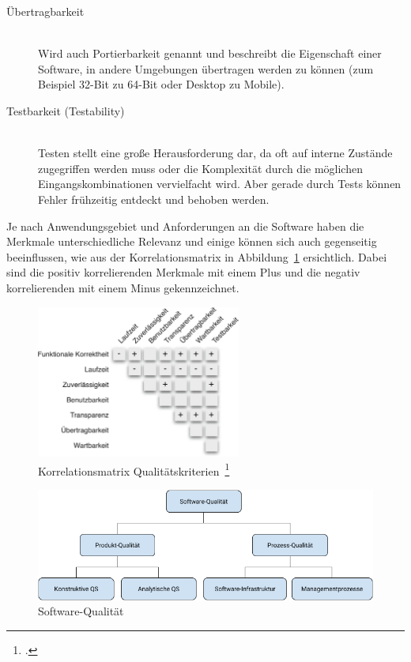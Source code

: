 \begin{description}
\begin{description}
    \item[Übertragbarkeit] \hfill \\ Wird auch Portierbarkeit genannt und beschreibt die Eigenschaft einer Software, in andere Umgebungen übertragen werden zu können (zum Beispiel 32-Bit zu 64-Bit oder Desktop zu Mobile).
    \item[Testbarkeit (Testability)] \hfill \\ Testen stellt eine große Herausforderung dar, da oft auf interne Zustände zugegriffen werden muss oder die Komplexität durch die möglichen Eingangskombinationen vervielfacht wird. Aber gerade durch Tests können Fehler frühzeitig entdeckt und behoben werden.
  \end{description}
\end{description}

Je nach Anwendungsgebiet und Anforderungen an die Software haben die Merkmale unterschiedliche Relevanz und einige können sich auch gegenseitig beeinflussen, wie aus der Korrelationsmatrix in Abbildung~\ref{fig:korrelationsmatrix} ersichtlich.
Dabei sind die positiv korrelierenden Merkmale mit einem Plus und die negativ korrelierenden mit einem Minus gekennzeichnet.

\begin{savenotes}
  \begin{figure}[H] 
    \centering
       \includegraphics[width=0.6\textwidth]{img/korrelationsmatrix-kriterien.png}
    \caption[Korrelationsmatrix Qualitätskriterien]{Korrelationsmatrix Qualitätskriterien~\footcite[][S. 11, Abb. 1.3]{hoffmann_software_qualitat_2013}}\label{fig:korrelationsmatrix}
  \end{figure}
\end{savenotes}

\begin{savenotes}
  \begin{figure}[H] 
    \centering
       \includegraphics[width=1.0\textwidth]{img/software-quality.png}
    \caption[Software-Qualität]{Software-Qualität}\label{fig:software-quality}
  \end{figure}
\end{savenotes}

